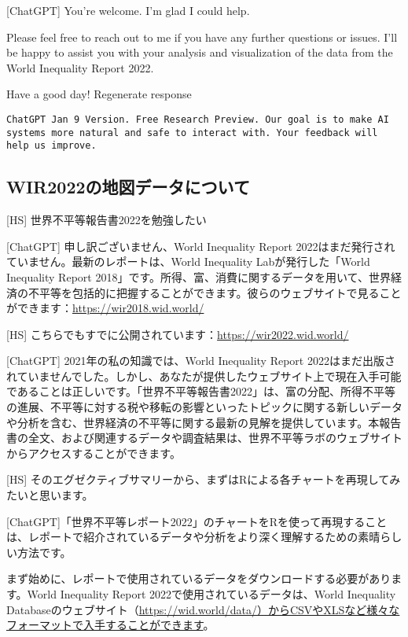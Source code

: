\documentclass[
]{bxjsbook}
\theoremstyle{definition}
\theoremstyle{definition}
\theoremstyle{definition}
\theoremstyle{definition}
\theoremstyle{remark}
\begin{document}
{[}ChatGPT{]} You're welcome. I'm glad I could help.

Please feel free to reach out to me if you have any further questions or issues. I'll be happy to assist you with your analysis and visualization of the data from the World Inequality Report 2022.

Have a good day!
Regenerate response

\begin{verbatim}
ChatGPT Jan 9 Version. Free Research Preview. Our goal is to make AI systems more natural and safe to interact with. Your feedback will help us improve.
\end{verbatim}

\hypertarget{mapdataofwir2022j}{%
\subsection{WIR2022の地図データについて}\label{mapdataofwir2022j}}

{[}HS{]} 世界不平等報告書2022を勉強したい

{[}ChatGPT{]} 申し訳ございません、World Inequality Report 2022はまだ発行されていません。最新のレポートは、World Inequality Labが発行した「World Inequality Report 2018」です。所得、富、消費に関するデータを用いて、世界経済の不平等を包括的に把握することができます。彼らのウェブサイトで見ることができます：\url{https://wir2018.wid.world/}

{[}HS{]} こちらでもすでに公開されています：\url{https://wir2022.wid.world/}

{[}ChatGPT{]} 2021年の私の知識では、World Inequality Report 2022はまだ出版されていませんでした。しかし、あなたが提供したウェブサイト上で現在入手可能であることは正しいです。「世界不平等報告書2022」は、富の分配、所得不平等の進展、不平等に対する税や移転の影響といったトピックに関する新しいデータや分析を含む、世界経済の不平等に関する最新の見解を提供しています。本報告書の全文、および関連するデータや調査結果は、世界不平等ラボのウェブサイトからアクセスすることができます。

{[}HS{]} そのエグゼクティブサマリーから、まずはRによる各チャートを再現してみたいと思います。

{[}ChatGPT{]}「世界不平等レポート2022」のチャートをRを使って再現することは、レポートで紹介されているデータや分析をより深く理解するための素晴らしい方法です。

まず始めに、レポートで使用されているデータをダウンロードする必要があります。World Inequality Report 2022で使用されているデータは、World Inequality Databaseのウェブサイト（\url{https://wid.world/data/）からCSVやXLSなど様々なフォーマットで入手することができます}。
\end{document}
